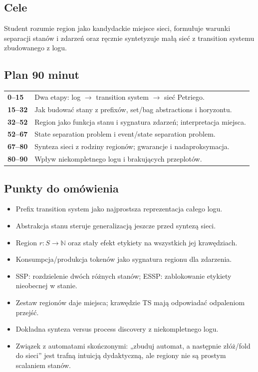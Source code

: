 \documentclass[11pt,a4paper]{article}
\begin{document}
\subsection{Cele}
Student rozumie region jako kandydackie miejsce sieci, formułuje warunki separacji stanów i zdarzeń oraz ręcznie syntetyzuje małą sieć z transition systemu zbudowanego z logu.

\subsection{Plan 90 minut}
\begin{center}\small\begin{tabularx}{0.96\textwidth}{@{}>{\bfseries}p{18mm}X@{}}
0--15 & Dwa etapy: log $\to$ transition system $\to$ sieć Petriego.\\
15--32 & Jak budować stany z prefixów, set/bag abstractions i horyzontu.\\
32--52 & Region jako funkcja stanu i sygnatura zdarzeń; interpretacja miejsca.\\
52--67 & State separation problem i event/state separation problem.\\
67--80 & Synteza sieci z rodziny regionów; gwarancje i nadaproksymacja.\\
80--90 & Wpływ niekompletnego logu i brakujących przeplotów.\\
\end{tabularx}\end{center}

\subsection{Punkty do omówienia}
\begin{itemize}
\item Prefix transition system jako najprostsza reprezentacja całego logu.
\item Abstrakcja stanu steruje generalizacją jeszcze przed syntezą sieci.
\item Region $r:S\to\mathbb{N}$ oraz stały efekt etykiety na wszystkich jej krawędziach.
\item Konsumpcja/produkcja tokenów jako sygnatura regionu dla zdarzenia.
\item SSP: rozdzielenie dwóch różnych stanów; ESSP: zablokowanie etykiety nieobecnej w stanie.
\item Zestaw regionów daje miejsca; krawędzie TS mają odpowiadać odpaleniom przejść.
\item Dokładna synteza versus process discovery z niekompletnego logu.
\item Związek z automatami skończonymi: „zbuduj automat, a następnie złóż/fold do sieci” jest trafną intuicją dydaktyczną, ale regiony nie są prostym scalaniem stanów.
\end{itemize}
\end{document}
